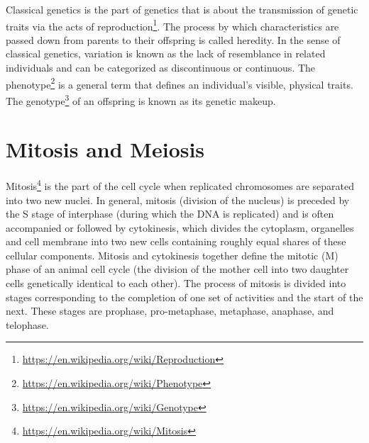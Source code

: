 \documentclass[]{book}
\let\rmarkdownfootnote\footnote%
\def\footnote{\protect\rmarkdownfootnote}
\renewcommand{\href}[2]{#2\footnote{\url{#1}}}
\theoremstyle{definition}
\theoremstyle{definition}
\theoremstyle{definition}
\theoremstyle{remark}
\begin{document}
Classical genetics is the part of genetics that is about the
transmission of genetic traits via the acts of
\href{https://en.wikipedia.org/wiki/Reproduction}{reproduction}. The
process by which characteristics are passed down from parents to their
offspring is called heredity. In the sense of classical genetics,
variation is known as the lack of resemblance in related individuals and
can be categorized as discontinuous or continuous. The
\href{https://en.wikipedia.org/wiki/Phenotype}{phenotype} is a general
term that defines an individual's visible, physical traits. The
\href{https://en.wikipedia.org/wiki/Genotype}{genotype} of an offspring
is known as its genetic makeup.

\chapter{Mitosis and Meiosis}\label{mitosis-and-meiosis}

\href{https://en.wikipedia.org/wiki/Mitosis}{Mitosis} is the part of the
cell cycle when replicated chromosomes are separated into two new
nuclei. In general, mitosis (division of the nucleus) is preceded by the
S stage of interphase (during which the DNA is replicated) and is often
accompanied or followed by cytokinesis, which divides the cytoplasm,
organelles and cell membrane into two new cells containing roughly equal
shares of these cellular components. Mitosis and cytokinesis together
define the mitotic (M) phase of an animal cell cycle (the division of
the mother cell into two daughter cells genetically identical to each
other). The process of mitosis is divided into stages corresponding to
the completion of one set of activities and the start of the next. These
stages are prophase, pro-metaphase, metaphase, anaphase, and telophase.
\end{document}
